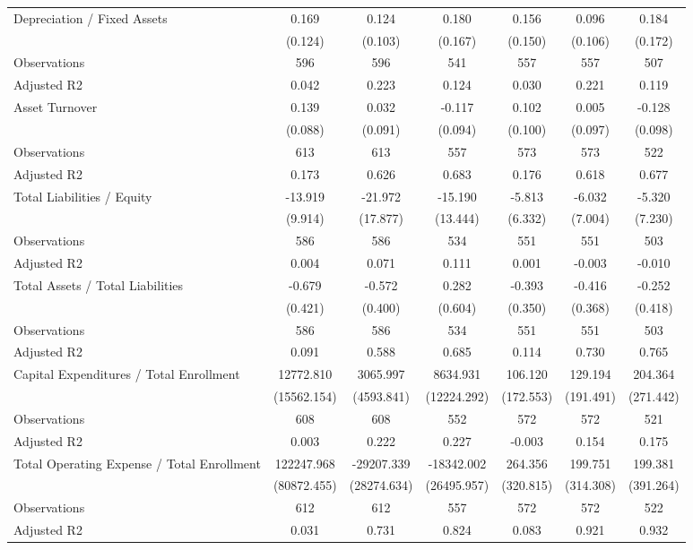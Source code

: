 \begin{table}[!htbp]
{\begin{tabular}{lcccccc}
Depreciation / Fixed Assets & 0.169 & 0.124 & 0.180 & 0.156 & 0.096 & 0.184 \\
 & (0.124) & (0.103) & (0.167) & (0.150) & (0.106) & (0.172) \\
\quad Observations & 596 & 596 & 541 & 557 & 557 & 507 \\
\quad Adjusted R2 & 0.042 & 0.223 & 0.124 & 0.030 & 0.221 & 0.119 \\
Asset Turnover & 0.139 & 0.032 & -0.117 & 0.102 & 0.005 & -0.128 \\
 & (0.088) & (0.091) & (0.094) & (0.100) & (0.097) & (0.098) \\
\quad Observations & 613 & 613 & 557 & 573 & 573 & 522 \\
\quad Adjusted R2 & 0.173 & 0.626 & 0.683 & 0.176 & 0.618 & 0.677 \\
Total Liabilities / Equity & -13.919 & -21.972 & -15.190 & -5.813 & -6.032 & -5.320 \\
 & (9.914) & (17.877) & (13.444) & (6.332) & (7.004) & (7.230) \\
\quad Observations & 586 & 586 & 534 & 551 & 551 & 503 \\
\quad Adjusted R2 & 0.004 & 0.071 & 0.111 & 0.001 & -0.003 & -0.010 \\
Total Assets / Total Liabilities & -0.679 & -0.572 & 0.282 & -0.393 & -0.416 & -0.252 \\
 & (0.421) & (0.400) & (0.604) & (0.350) & (0.368) & (0.418) \\
\quad Observations & 586 & 586 & 534 & 551 & 551 & 503 \\
\quad Adjusted R2 & 0.091 & 0.588 & 0.685 & 0.114 & 0.730 & 0.765 \\
Capital Expenditures / Total Enrollment & 12772.810 & 3065.997 & 8634.931 & 106.120 & 129.194 & 204.364 \\
 & (15562.154) & (4593.841) & (12224.292) & (172.553) & (191.491) & (271.442) \\
\quad Observations & 608 & 608 & 552 & 572 & 572 & 521 \\
\quad Adjusted R2 & 0.003 & 0.222 & 0.227 & -0.003 & 0.154 & 0.175 \\
Total Operating Expense / Total Enrollment & 122247.968 & -29207.339 & -18342.002 & 264.356 & 199.751 & 199.381 \\
 & (80872.455) & (28274.634) & (26495.957) & (320.815) & (314.308) & (391.264) \\
\quad Observations & 612 & 612 & 557 & 572 & 572 & 522 \\
\quad Adjusted R2 & 0.031 & 0.731 & 0.824 & 0.083 & 0.921 & 0.932 \\

\end{tabular}}
\end{table}

